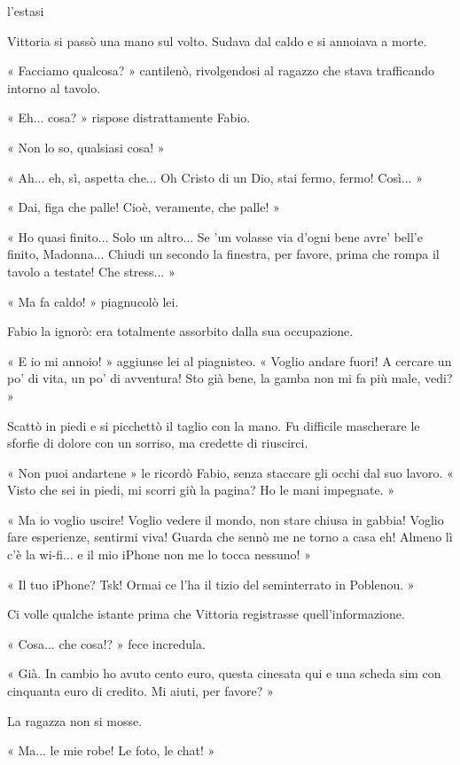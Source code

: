 l'estasi


Vittoria si passò una mano sul volto. Sudava dal caldo e si annoiava a morte.

« Facciamo qualcosa? » cantilenò, rivolgendosi al ragazzo che stava trafficando intorno al tavolo.

« Eh... cosa? » rispose distrattamente Fabio.

« Non lo so, qualsiasi cosa! »

« Ah... eh, sì, aspetta che... Oh Cristo di un Dio, stai fermo, fermo! Così... »

« Dai, figa che palle! Cioè, veramente, che palle! »

« Ho quasi finito... Solo un altro... Se 'un volasse via d'ogni bene avre' bell'e finito, Madonna... Chiudi un secondo la finestra, per favore, prima che rompa il tavolo a testate! Che stress... »

« Ma fa caldo! » piagnucolò lei.

Fabio la ignorò: era totalmente assorbito dalla sua occupazione.

« E io mi annoio! » aggiunse lei al piagnisteo. « Voglio andare fuori! A cercare un po' di vita, un po' di avventura! Sto già bene, la gamba non mi fa più male, vedi? »

Scattò in piedi e si picchettò il taglio con la mano. Fu difficile mascherare le sforfie di dolore con un sorriso, ma credette di riuscirci.

« Non puoi andartene » le ricordò Fabio, senza staccare gli occhi dal suo lavoro. « Visto che sei in piedi, mi scorri giù la pagina? Ho le mani impegnate. »

« Ma io voglio uscire! Voglio vedere il mondo, non stare chiusa in gabbia! Voglio fare esperienze, sentirmi viva! Guarda che sennò me ne torno a casa eh! Almeno lì c'è la wi-fi... e il mio iPhone non me lo tocca nessuno! »

« Il tuo iPhone? Tsk! Ormai ce l'ha il tizio del seminterrato in Poblenou. »

Ci volle qualche istante prima che Vittoria registrasse quell'informazione.

« Cosa... che cosa!? » fece incredula.

« Già. In cambio ho avuto cento euro, questa cinesata qui e una scheda sim con cinquanta euro di credito. Mi aiuti, per favore? »

La ragazza non si mosse.

« Ma... le mie robe! Le foto, le chat! »

